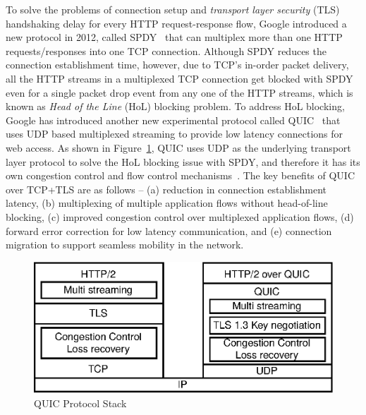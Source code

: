 To solve the problems of connection setup and {\em transport layer security} (TLS) handshaking delay for every HTTP request-response flow, Google introduced a new protocol in 2012, called  SPDY~\cite{spdy,erman2015towards} that can multiplex more than one HTTP requests/responses into one TCP connection. Although SPDY reduces the connection establishment time, however, due to TCP's in-order packet delivery, all the HTTP streams in a multiplexed TCP connection get blocked with SPDY even for a single packet drop event from any one of the HTTP streams, which is known as {\em Head of the Line} (HoL) blocking problem. To address HoL blocking, Google has introduced another new experimental protocol called QUIC~\cite{roskind2015quic,cui2017innovating,quicisquic} that uses UDP based multiplexed streaming to provide low latency connections for web access. As shown in Figure~\ref{fig:quic-protocolstack}, QUIC uses UDP as the underlying transport layer protocol to solve the HoL blocking issue with SPDY, and therefore it has its own congestion control and flow control mechanisms~\cite{cui2017innovating,roskind2015quic}. The key benefits of QUIC over TCP+TLS are as follows -- (a) reduction in connection establishment latency, (b) multiplexing of multiple application flows without head-of-line blocking, (c) improved congestion control over multiplexed application flows, (d) forward error correction for low latency communication, and (e) connection migration to support seamless mobility in the network. 

\begin{figure}[!t]
	\centering
	\includegraphics[width=0.7\linewidth]{img/quic-protocolstack}
	\caption{QUIC Protocol Stack}
	\label{fig:quic-protocolstack}
\end{figure}


